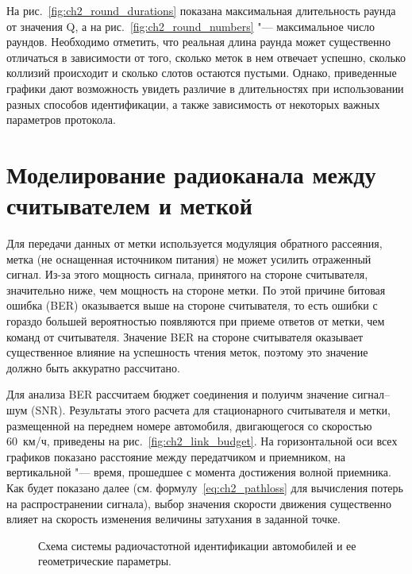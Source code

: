 На рис.~\ref{fig:ch2_round_durations} показана максимальная длительность раунда от значения Q, а на рис.~\ref{fig:ch2_round_numbers} "--- максимальное число раундов. Необходимо отметить, что реальная длина раунда может существенно отличаться в зависимости от того, сколько меток в нем отвечает успешно, сколько коллизий происходит и сколько слотов остаются пустыми. Однако, приведенные графики дают возможность увидеть различие в длительностях при использовании разных способов идентификации, а также зависимость от некоторых важных параметров протокола.









\section{Моделирование радиоканала между считывателем и меткой}\label{sec:ch2_channel}
Для передачи данных от метки используется модуляция обратного рассеяния, метка (не оснащенная источником питания) не может усилить отраженный сигнал. Из-за этого мощность сигнала, принятого на стороне считывателя, значительно ниже, чем мощность на стороне метки. По этой причине битовая ошибка (BER) оказывается выше на стороне считывателя, то есть ошибки с гораздо большей вероятностью появляются при приеме ответов от метки, чем команд от считывателя. Значение BER на стороне считывателя оказывает существенное влияние на успешность чтения меток, поэтому это значение должно быть аккуратно рассчитано.

Для анализа BER рассчитаем бюджет соединения и полуичм значение сигнал--шум (SNR). Результаты этого расчета для стационарного считывателя и метки, размещенной на переднем номере автомобиля, двигающегося со скоростью 60~км/ч, приведены на рис.~\ref{fig:ch2_link_budget}. На горизонтальной оси всех графиков показано расстояние между передатчиком и приемником, на вертикальной "--- время, прошедшее с момента достижения волной приемника. Как будет показано далее (см. формулу~\eqref{eq:ch2_pathloss} для вычисления потерь на распространении сигнала), выбор значения скорости движения существенно влияет на скорость изменения величины затухания в заданной точке.

\begin{figure}[!t]
	\caption{Схема системы радиочастотной идентификации автомобилей и ее геометрические параметры.}
	\label{fig:ch2_geometry}
\end{figure}



